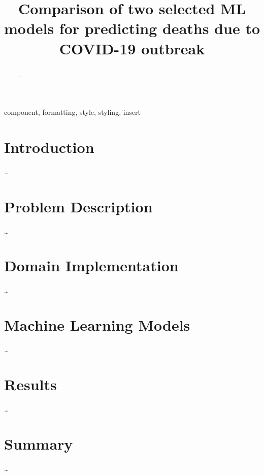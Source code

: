 \documentclass[conference]{IEEEtran}
\begin{document}
\title{Comparison of two selected ML models for predicting deaths due to COVID-19 outbreak}

\author{
\and
{}
}


\maketitle

\begin{abstract}
\dots
\end{abstract}

\begin{IEEEkeywords}
component, formatting, style, styling, insert
\end{IEEEkeywords}

\section{Introduction}
\dots

\section{Problem Description}
\dots

\section{Domain Implementation}
\dots

\section{Machine Learning Models}
\dots

\section{Results}
\dots

\section{Summary}
\dots


\begin{thebibliography}{00}
\end{thebibliography}
\vspace{12pt}
\end{document}
